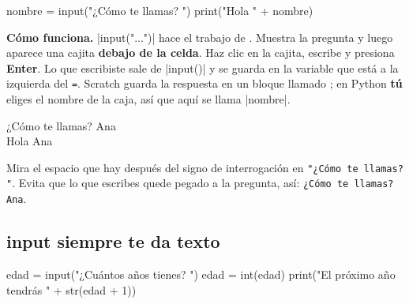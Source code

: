 \begin{tcbraster}[raster columns=2, raster equal height=rows, raster column skip=12pt, raster valign=center, raster force size=false, raster column 1/.style={width=0.36\linewidth}, raster column 2/.style={width=0.64\linewidth-12pt}]
\begin{tcolorbox}[colback=white, colframe=white, boxrule=0pt, valign=center, left=0pt, right=0pt]
\begin{scratch}[scale=0.76]
\end{scratch}
\end{tcolorbox}
\begin{code}
nombre = input("¿Cómo te llamas? ")
print("Hola " + nombre)
\end{code}
\end{tcbraster}

\textbf{Cómo funciona.} \py|input("...")| hace el trabajo de . Muestra la pregunta y luego aparece una cajita \textbf{debajo de la celda}. Haz clic en la cajita, escribe y presiona \textbf{Enter}. Lo que escribiste sale de \py|input()| y se guarda en la variable que está a la izquierda del \texttt{=}. Scratch guarda la respuesta en un bloque llamado ; en Python \textbf{tú} eliges el nombre de la caja, así que aquí se llama \py|nombre|.

\begin{outputbox}
¿Cómo te llamas? Ana\\
Hola Ana
\end{outputbox}

\begin{think}
Mira el espacio que hay después del signo de interrogación en \texttt{"¿Cómo te llamas? "}. Evita que lo que escribes quede pegado a la pregunta, así: \texttt{¿Cómo te llamas?Ana}.
\end{think}

\subsection*{input siempre te da texto}

\begin{center}
\begin{scratch}
\end{scratch}
\end{center}
\vspace{-4pt}
\begin{code}
edad = input("¿Cuántos años tienes? ")
edad = int(edad)
print("El próximo año tendrás " + str(edad + 1))
\end{code}

